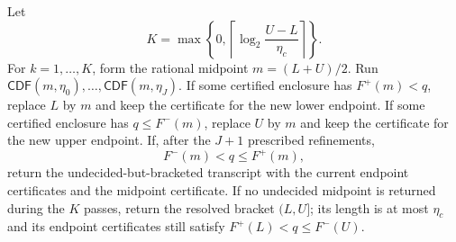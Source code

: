 \begin{algorithmiclemma}
Let
\[
K=\max\left\{0,\left\lceil\log_2\frac{U-L}{\eta_c}\right\rceil\right\}.
\]
For \(k=1,\ldots,K\), form the rational midpoint \(m=(L+U)/2\).  Run
\(\mathsf{CDF}(m,\eta_0),\ldots,\mathsf{CDF}(m,\eta_J)\).  If some certified
enclosure has \(F^+(m)<q\), replace \(L\) by \(m\) and keep the certificate
for the new lower endpoint.  If some certified enclosure has
\(q\le F^-(m)\), replace \(U\) by \(m\) and keep the certificate for the new
upper endpoint.  If, after the \(J+1\) prescribed refinements,
\[
F^-(m)<q\le F^+(m),
\]
return the undecided-but-bracketed transcript with the current endpoint
certificates and the midpoint certificate.  If no undecided midpoint is
returned during the \(K\) passes, return the resolved bracket \((L,U]\); its
length is at most \(\eta_c\) and its endpoint certificates still satisfy
\(F^+(L)<q\le F^-(U)\).
\end{algorithmiclemma}

